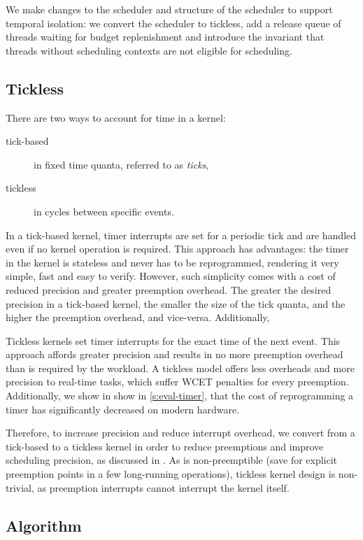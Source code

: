 We make changes to the scheduler and structure of the scheduler to support temporal isolation: we
convert the scheduler to tickless, add a release queue of threads waiting for budget replenishment
and introduce the invariant that threads without scheduling contexts are not eligible for
scheduling.

\subsection{Tickless}

There are two ways to account for time in a kernel:
\begin{description}
    \item[tick-based] in fixed time quanta, referred to as \emph{ticks},
    \item[tickless] in cycles between specific events.
\end{description}

In a tick-based kernel, timer interrupts are set for a periodic tick and are
handled even if no kernel operation is required.  This approach has advantages:
the timer in the kernel is stateless and never has to be reprogrammed,
rendering it very simple, fast and easy to verify.  However, such simplicity
comes with a cost of reduced precision and greater preemption overhead.  The
greater the desired precision in a tick-based kernel, the smaller the size of
the tick quanta, and the higher the preemption overhead, and vice-versa.
Additionally,

Tickless kernels set timer interrupts for the exact time of the next event.
This approach affords greater precision and results in no more preemption
overhead than is required by the workload.  A tickless model offers less
overheads and more precision to real-time tasks, which suffer \gls{WCET}
penalties for every preemption.  Additionally, we show in show in
\cref{s:eval-timer}, that the cost of reprogramming a timer has significantly
decreased on modern hardware.

Therefore, to increase precision and reduce interrupt overhead, we convert \selfour from a tick-based
 to a tickless kernel in order to reduce preemptions and
improve scheduling precision, as discussed in .
As \selfour is non-preemptible (save for explicit preemption points in a few long-running
operations), tickless kernel design is non-trivial, as preemption interrupts cannot interrupt the
kernel itself.

\subsection{Algorithm}

